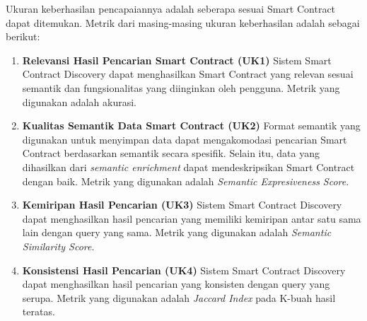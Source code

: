 
Ukuran keberhasilan pencapaiannya adalah seberapa sesuai Smart Contract dapat ditemukan. Metrik dari masing-masing ukuran keberhasilan adalah sebagai berikut:

\begin{enumerate}
  \item \textbf{Relevansi Hasil Pencarian Smart Contract (UK1)} \newline 
  Sistem Smart Contract Discovery dapat menghasilkan Smart Contract yang relevan sesuai semantik dan fungsionalitas yang diinginkan oleh pengguna. Metrik yang digunakan adalah akurasi. 

  \item \textbf{Kualitas Semantik Data Smart Contract (UK2)} \newline
  Format semantik yang digunakan untuk menyimpan data dapat mengakomodasi pencarian Smart Contract berdasarkan semantik secara spesifik. Selain itu, data yang dihasilkan dari \textit{semantic enrichment} dapat mendeskripsikan Smart Contract dengan baik. Metrik yang digunakan adalah \textit{Semantic Expresiveness Score}.

  \item \textbf{Kemiripan Hasil Pencarian (UK3)} \newline
  Sistem Smart Contract Discovery dapat menghasilkan hasil pencarian yang memiliki kemiripan antar satu sama lain dengan query yang sama. Metrik yang digunakan adalah \textit{Semantic Similarity Score}.

  \item \textbf{Konsistensi Hasil Pencarian (UK4)} \newline
  Sistem Smart Contract Discovery dapat menghasilkan hasil pencarian yang konsisten dengan query yang serupa. Metrik yang digunakan adalah \textit{Jaccard Index} pada K-buah hasil teratas.
  

\end{enumerate}
